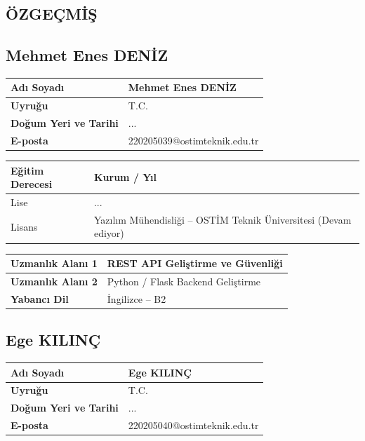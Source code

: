 \begin{center}
{\section*{\large ÖZGEÇMİŞ}}
\end{center}

\subsection*{Mehmet Enes DENİZ}

\begin{tabular}{|L{4.5cm}|L{9.5cm}|}
\hline
\textbf{Adı Soyadı} & Mehmet Enes DENİZ \\
\hline
\textbf{Uyruğu} & T.C. \\
\hline
\textbf{Doğum Yeri ve Tarihi} & ... \\
\hline
\textbf{E-posta} & 220205039@ostimteknik.edu.tr \\
\hline
\end{tabular}

\vspace{0.4cm}

\begin{tabular}{|L{4.5cm}|L{9.5cm}|}
\hline
\textbf{Eğitim Derecesi} & \textbf{Kurum / Yıl} \\
\hline
Lise & ... \\
\hline
Lisans & Yazılım Mühendisliği -- OSTİM Teknik Üniversitesi (Devam ediyor) \\
\hline
\end{tabular}

\vspace{0.4cm}

\begin{tabular}{|L{4.5cm}|L{9.5cm}|}
\hline
\textbf{Uzmanlık Alanı 1} & REST API Geliştirme ve Güvenliği \\
\hline
\textbf{Uzmanlık Alanı 2} & Python / Flask Backend Geliştirme \\
\hline
\textbf{Yabancı Dil} & İngilizce -- B2 \\
\hline
\end{tabular}

\vspace{1.2cm}

\subsection*{Ege KILINÇ}

\begin{tabular}{|L{4.5cm}|L{9.5cm}|}
\hline
\textbf{Adı Soyadı} & Ege KILINÇ \\
\hline
\textbf{Uyruğu} & T.C. \\
\hline
\textbf{Doğum Yeri ve Tarihi} & ... \\
\hline
\textbf{E-posta} & 220205040@ostimteknik.edu.tr \\
\hline
\end{tabular}

